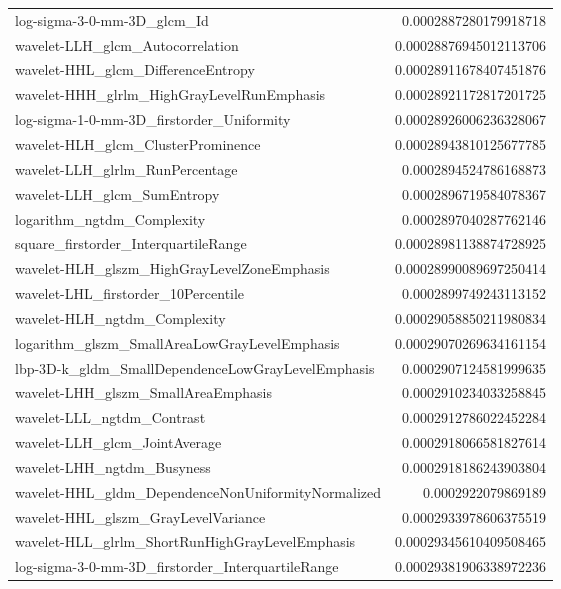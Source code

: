 {\begin{xltabular}[H]{\textwidth}{X r}
        log-sigma-3-0-mm-3D\_glcm\_Id & 0.0002887280179918718 \\
        wavelet-LLH\_glcm\_Autocorrelation & 0.00028876945012113706 \\
        wavelet-HHL\_glcm\_DifferenceEntropy & 0.00028911678407451876 \\
        wavelet-HHH\_glrlm\_HighGrayLevelRunEmphasis & 0.00028921172817201725 \\
        log-sigma-1-0-mm-3D\_firstorder\_Uniformity & 0.00028926006236328067 \\
        wavelet-HLH\_glcm\_ClusterProminence & 0.00028943810125677785 \\
        wavelet-LLH\_glrlm\_RunPercentage & 0.0002894524786168873 \\
        wavelet-LLH\_glcm\_SumEntropy & 0.0002896719584078367 \\
        logarithm\_ngtdm\_Complexity & 0.0002897040287762146 \\
        square\_firstorder\_InterquartileRange & 0.00028981138874728925 \\
        wavelet-HLH\_glszm\_HighGrayLevelZoneEmphasis & 0.00028990089697250414 \\
        wavelet-LHL\_firstorder\_10Percentile & 0.0002899749243113152 \\
        wavelet-HLH\_ngtdm\_Complexity & 0.00029058850211980834 \\
        logarithm\_glszm\_SmallAreaLowGrayLevelEmphasis & 0.00029070269634161154 \\
        lbp-3D-k\_gldm\_SmallDependenceLowGrayLevelEmphasis & 0.0002907124581999635 \\
        wavelet-LHH\_glszm\_SmallAreaEmphasis & 0.0002910234033258845 \\
        wavelet-LLL\_ngtdm\_Contrast & 0.0002912786022452284 \\
        wavelet-LLH\_glcm\_JointAverage & 0.0002918066581827614 \\
        wavelet-LHH\_ngtdm\_Busyness & 0.0002918186243903804 \\
        wavelet-HHL\_gldm\_DependenceNonUniformityNormalized & 0.0002922079869189 \\
        wavelet-HHL\_glszm\_GrayLevelVariance & 0.0002933978606375519 \\
        wavelet-HLL\_glrlm\_ShortRunHighGrayLevelEmphasis & 0.00029345610409508465 \\
        log-sigma-3-0-mm-3D\_firstorder\_InterquartileRange & 0.00029381906338972236 \\

\end{xltabular}}

